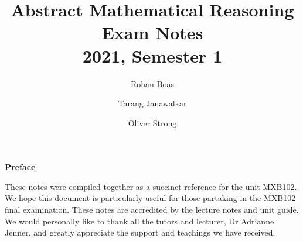 \documentclass{article}
\title{\textbf{Abstract Mathematical Reasoning}
    \texorpdfstring{\\}{ } {\large Exam Notes}
    \texorpdfstring{\\}{ } {\normalsize 2021, Semester 1}}
\author{
    Rohan Boas \and Tarang Janawalkar \and Oliver Strong
}
\date{}
\theoremstyle{plain}
\numberwithin{theorem}{subsection}
\theoremstyle{definition}
\numberwithin{definition}{subsection}
\theoremstyle{remark}
\numberwithin{note}{subsection}
\begin{document}
\begin{titlepage}
\maketitle
\thispagestyle{empty}
\vfill
\begin{adjustwidth}{4cm}{4cm}
{\Large\bf Preface}
\vspace{0.7em}

These notes were compiled together as a succinct reference for the unit MXB102. We hope this document is particularly useful for those partaking in the MXB102 final examination.  These notes are accredited by the lecture notes and unit guide. We would personally like to thank all the tutors and lecturer, Dr Adrianne Jenner, and greatly appreciate the support and teachings we have received.
\end{adjustwidth}
\vfill
\begin{adjustwidth}{5cm}{5cm}
\doclicenseThis
\end{adjustwidth}
\vfill
\end{titlepage}

\newpage
\end{document}
